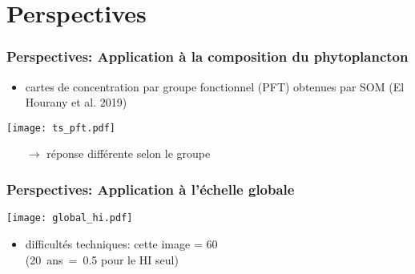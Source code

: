 \documentclass[11pt, french, aspectratio=32]{beamer}
\begin{document}
\section{Perspectives}


\begin{frame}
  \frametitle{Perspectives: Application à la composition du phytoplancton}

  \begin{itemize}
    \item cartes de concentration par groupe fonctionnel (PFT) obtenues par SOM (El Hourany et al. 2019)
  \end{itemize}

  \texttt{[image: ts\_pft.pdf]}

  \begin{itemize}
    \item[$\longrightarrow$] réponse différente selon le groupe
  \end{itemize}
\end{frame}


\begin{frame}
  \frametitle{Perspectives: Application à l'échelle globale}

  \texttt{[image: global\_hi.pdf]}

  \begin{itemize}
    \item difficultés techniques: cette image = \qty{60}{\MO}
          \\{\small(\mbox{20 ans = \qty{0.5}{\TO}} pour le HI seul)}
  \end{itemize}

\end{frame}

\end{document}

